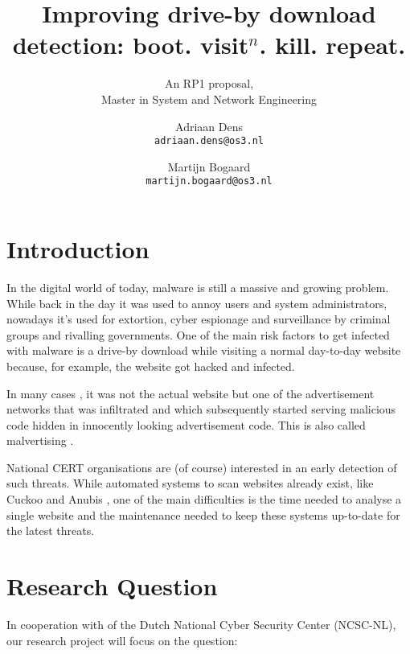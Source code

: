 \documentclass{scrartcl}
\title{Improving drive-by download detection: boot. visit$^n$. kill. repeat.}
\subtitle{An RP1 proposal,\\Master in System and Network Engineering}
\author{
  Adriaan Dens\\
   \texttt{adriaan.dens@os3.nl}
  \and
  Martijn Bogaard\\
   \texttt{martijn.bogaard@os3.nl}
}
\begin{document}
\maketitle

\section{Introduction}

In the digital world of today, malware is still a massive and growing problem. While back in the day it was used to annoy users and system administrators, nowadays it's used for extortion, cyber espionage and surveillance by criminal groups and rivalling governments. One of the main risk factors to get infected with malware is a drive-by download while visiting a normal day-to-day website because, for example, the website got hacked and infected. 

In many cases \cite{proofpoint}, it was not the actual website but one of the advertisement networks that was infiltrated and which subsequently started serving malicious code hidden in innocently looking advertisement code. This is also called malvertising \cite{Li2012}.


National CERT organisations are (of course) interested in an early detection of such threats. While automated systems to scan websites already exist, like Cuckoo \cite{cuckoo} and Anubis \cite{anubis}, one of the main difficulties is the time needed to analyse a single website and the maintenance needed to keep these systems up-to-date for the latest threats.

\section{Research Question}
In cooperation with of the Dutch National Cyber Security Center (NCSC-NL), our research project will focus on the question:\\ %
\end{document}
